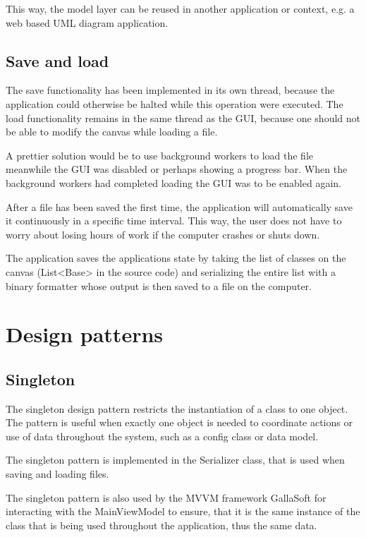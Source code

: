 This way, the model layer can be reused in another application or context, e.g.  a web based UML diagram application.

\subsection{Save and load}
The save functionality has been implemented in its own thread, because the application could otherwise be halted while this operation were executed. The load functionality remains in the same thread as the GUI, because one should not be able to modify the canvas while loading a file.

A prettier solution would be to use background workers to load the file meanwhile the GUI was disabled or perhaps showing a progress bar. When the background workers had completed loading the GUI was to be enabled again.

After a file has been saved the first time, the application will automatically save it continuously in a specific time interval. This way, the user does not have to worry about losing hours of work if the computer crashes or shuts down.

The application saves the applications state by taking the list of classes on the canvas (\textsf{List<Base>} in the source code) and serializing the entire list with a binary formatter whose output is then saved to a file on the computer.

\section{Design patterns}
\label{sec:design_pattern}
\subsection{Singleton}
The singleton design pattern restricts the instantiation of a class to one object.
The pattern is useful when exactly one object is needed to coordinate actions or use of data throughout the system, such as a config class or data model.

The singleton pattern is implemented in the \textsf{Serializer} class, that is used when saving and loading files. 

The singleton pattern is also used by the MVVM framework GallaSoft for interacting with the \textsf{MainViewModel} to ensure, that it is the same instance of the class that is being used throughout the application, thus the same data.

